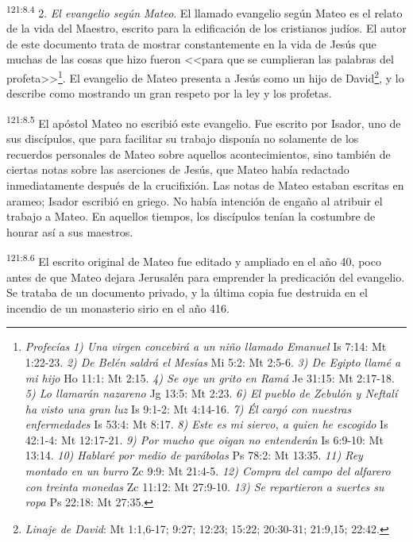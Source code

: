 \par 
\textsuperscript{121:8.4} 2. \textit{El evangelio según Mateo}. El llamado evangelio según Mateo es el relato de la vida del Maestro, escrito para la edificación de los cristianos judíos. El autor de este documento trata de mostrar constantemente en la vida de Jesús que muchas de las cosas que hizo fueron <<para que se cumplieran las palabras del profeta>>\footnote{\textit{Profecías} \textit{1) Una virgen concebirá a un niño llamado Emanuel} Is 7:14: Mt 1:22-23. \textit{2) De Belén saldrá el Mesías} Mi 5:2: Mt 2:5-6. \textit{3) De Egipto llamé a mi hijo} Ho 11:1: Mt 2:15. \textit{4) Se oye un grito en Ramá} Je 31:15: Mt 2:17-18. \textit{5) Lo llamarán nazareno} Jg 13:5: Mt 2:23. \textit{6) El pueblo de Zebulón y Neftalí ha visto una gran luz} Is 9:1-2: Mt 4:14-16. \textit{7) Él cargó con nuestras enfermedades} Is 53:4: Mt 8:17. \textit{8) Este es mi siervo, a quien he escogido} Is 42:1-4: Mt 12:17-21. \textit{9) Por mucho que oigan no entenderán} Is 6:9-10: Mt 13:14. \textit{10) Hablaré por medio de parábolas} Ps 78:2: Mt 13:35. \textit{11) Rey montado en un burro} Zc 9:9: Mt 21:4-5. \textit{12) Compra del campo del alfarero con treinta monedas} Zc 11:12: Mt 27:9-10. \textit{13) Se repartieron a suertes su ropa} Ps 22:18: Mt 27:35.}. El evangelio de Mateo presenta a Jesús como un hijo de David\footnote{\textit{Linaje de David}: Mt 1:1,6-17; 9:27; 12:23; 15:22; 20:30-31; 21:9,15; 22:42.}, y lo describe como mostrando un gran respeto por la ley y los profetas.

\par 
\textsuperscript{121:8.5} El apóstol Mateo no escribió este evangelio. Fue escrito por Isador, uno de sus discípulos, que para facilitar su trabajo disponía no solamente de los recuerdos personales de Mateo sobre aquellos acontecimientos, sino también de ciertas notas sobre las aserciones de Jesús, que Mateo había redactado inmediatamente después de la crucifixión. Las notas de Mateo estaban escritas en arameo; Isador escribió en griego. No había intención de engaño al atribuir el trabajo a Mateo. En aquellos tiempos, los discípulos tenían la costumbre de honrar así a sus maestros.

\par 
\textsuperscript{121:8.6} El escrito original de Mateo fue editado y ampliado en el año
40, poco antes de que Mateo dejara Jerusalén para emprender la predicación del evangelio. Se trataba de un documento privado, y la última copia fue destruida en el incendio de un monasterio sirio en el año 416.

